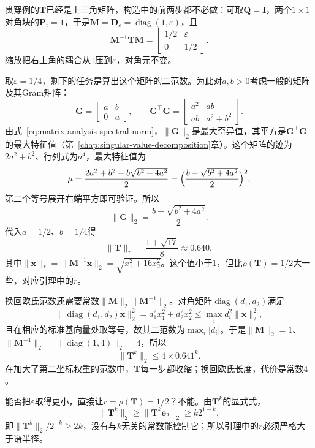 \begin{example}[贯穿例的坐标范数]
\label{ex:ls-coordinate-norm-contraction}
贯穿例的$\bm T$已经是上三角矩阵，构造中的前两步都不必做：可取$\bm Q=\bm I$，两个$1\times1$对角块的$\bm P_i=1$，于是$\bm M=\bm D_\varepsilon=\operatorname{diag}(1,\varepsilon)$，且
\[
 \bm M^{-1}\bm T\bm M=\begin{bmatrix}1/2&\varepsilon\\0&1/2\end{bmatrix}.
\]
缩放把右上角的耦合从$1$压到$\varepsilon$，对角元不变。

取$\varepsilon=1/4$，剩下的任务是算出这个矩阵的二范数。为此对$a,b>0$考虑一般的矩阵及其Gram矩阵：
\[
 \bm G=\begin{bmatrix}a&b\\0&a\end{bmatrix},\qquad
 \bm G^\top\bm G=\begin{bmatrix}a^2&ab\\ab&a^2+b^2\end{bmatrix}.
\]
由式~\eqref{eq:matrix-analysis-spectral-norm}，$\lVert\bm G\rVert_2$是最大奇异值，其平方是$\bm G^\top\bm G$的最大特征值（第~\ref{chap:singular-value-decomposition}章）。这个矩阵的迹为$2a^2+b^2$、行列式为$a^4$，最大特征值为
\[
 \mu=\frac{2a^2+b^2+b\sqrt{b^2+4a^2}}{2}=\Bigl(\frac{b+\sqrt{b^2+4a^2}}{2}\Bigr)^2,
\]
第二个等号展开右端平方即可验证。所以
\[
 \lVert\bm G\rVert_2=\frac{b+\sqrt{b^2+4a^2}}{2}.
\]
代入$a=1/2$、$b=1/4$得
\[
 \lVert\bm T\rVert_*=\frac{1+\sqrt{17}}{8}\approx0.640,
\]
其中$\lVert\bm x\rVert_*=\lVert\bm M^{-1}\bm x\rVert_2=\sqrt{x_1^2+16x_2^2}$。这个值小于$1$，但比$\rho(\bm T)=1/2$大一些，对应引理中的$r$。

换回欧氏范数还需要常数$\lVert\bm M\rVert_2\lVert\bm M^{-1}\rVert_2$。对角矩阵$\operatorname{diag}(d_1,d_2)$满足
\[
 \lVert\operatorname{diag}(d_1,d_2)\bm x\rVert_2^2=d_1^2x_1^2+d_2^2x_2^2\leq\max_id_i^2\lVert\bm x\rVert_2^2 ,
\]
且在相应的标准基向量处取等号，故其二范数为$\max_i|d_i|$。于是$\lVert\bm M\rVert_2=1$、$\lVert\bm M^{-1}\rVert_2=\lVert\operatorname{diag}(1,4)\rVert_2=4$，所以
\[
 \lVert\bm T^k\rVert_2\leq4\times0.641^k .
\]
在加大了第二坐标权重的范数中，$\bm T$每一步都收缩；换回欧氏长度，代价是常数$4$。

能否把$\varepsilon$取得更小，直接让$r=\rho(\bm T)=1/2$？不能。由$\bm T^k$的显式式，
\[
 \lVert\bm T^k\rVert_2\geq\lVert\bm T^k\bm e_2\rVert_2\geq k2^{1-k},
\]
即$\lVert\bm T^k\rVert_2/2^{-k}\geq2k$，没有与$k$无关的常数能控制它；所以引理中的$r$必须严格大于谱半径。
\end{example}

